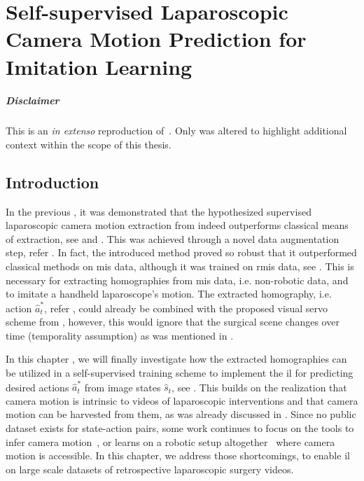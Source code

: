 \graphicspath{{chapter_4}}
\chapter[Self-supervised Laparoscopic Camera Motion Prediction]{Self-supervised Laparoscopic Camera Motion Prediction for Imitation Learning}
\label{chap:camera_motion_prediction}
\minitoc

\paragraph{Disclaimer} This  is an \textit{in extenso} reproduction of~\cite{huber2023deep}. Only  was altered to highlight additional context within the scope of this thesis.

\newpage

\section{Introduction}
\label{c4:sec:introduction}
In the previous , it was demonstrated that the hypothesized supervised laparoscopic camera motion extraction from  indeed outperforms classical means of extraction, see  and . This was achieved through a novel data augmentation step, refer . In fact, the introduced method proved so robust that it outperformed classical methods on \gls{mis} data, although it was trained on \gls{rmis} data, see . This is necessary for extracting homographies from \gls{mis} data, i.e. non-robotic data, and to imitate a handheld laparoscope's motion. The extracted homography, i.e. action $\hat{a}^*_t$, refer , could already be combined with the proposed visual servo scheme from , however, this would ignore that the surgical scene changes over time (temporality assumption) as was mentioned in .

In this chapter , we will finally investigate how the extracted homographies can be utilized in a self-supervised training scheme to implement the \gls{il} for predicting desired actions $\hat{a}^*_t$ from image states $\hat{s}_t$, see . This builds on the realization that camera motion is intrinsic to videos of laparoscopic interventions and that camera motion can be harvested from them, as was already discussed in . Since no public dataset exists for state-action pairs, some work continues to focus on the tools to infer camera motion~\cite{li2021data}, or learns on a robotic setup altogether~\cite{li20223d} where camera motion is accessible. In this chapter, we address those shortcomings, to enable \gls{il} on large scale datasets of retrospective laparoscopic surgery videos.

